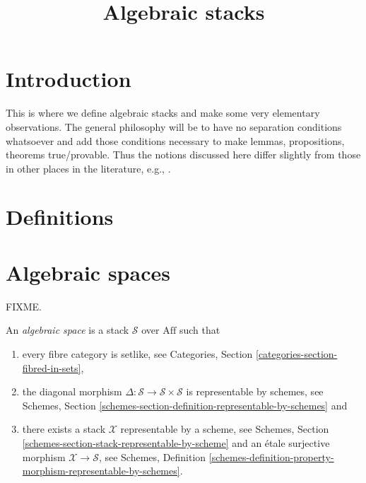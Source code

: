 

%


\title{Algebraic stacks}


\maketitle

\tableofcontents

\section{Introduction}
\label{section-introduction}

\noindent
This is where we define algebraic stacks and make some very elementary
observations. The general philosophy will be to have no separation
conditions whatsoever and add those conditions necessary to make lemmas,
propositions, theorems true/provable. Thus the notions discussed here 
differ slightly from those in other places in the literature, e.g.,
\cite{LM-B}.

\section{Definitions}
\label{section-definitions}

\section{Algebraic spaces}
\label{section-algebraic-spaces}

\noindent
FIXME.

\begin{definition}
\label{definition-algebraic-space}
An {\it algebraic space}
is a stack $\mathcal{S}$ over $\text{Aff}$ such that
\begin{enumerate}
\item every fibre category is setlike, see Categories, Section
\ref{categories-section-fibred-in-sets}, 
\item the diagonal morphism
$\Delta : \mathcal{S} \to \mathcal{S}\times\mathcal{S}$
is representable by schemes, see Schemes, Section
\ref{schemes-section-definition-representable-by-schemes} and
\item there exists a stack $\mathcal{X}$ representable by a scheme, see
Schemes, Section \ref{schemes-section-stack-representable-by-scheme}
and an \'etale surjective morphism $\mathcal{X} \to \mathcal{S}$,
see Schemes, Definition
\ref{schemes-definition-property-morphism-representable-by-schemes}.
\end{enumerate}
\end{definition}

